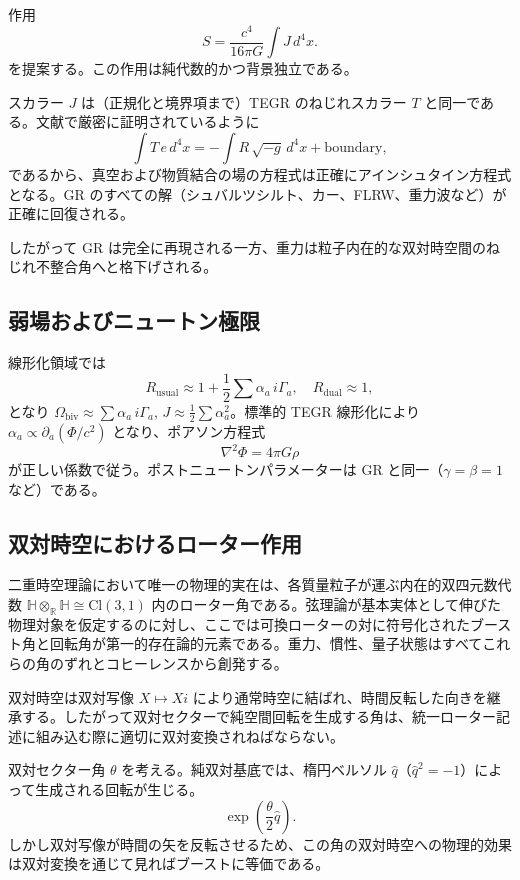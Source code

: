 \documentclass[dvipdfmx,a4paper]{article}
\begin{document}
作用
\[
S = \frac{c^4}{16\pi G} \int J \, d^4x.
\]
を提案する。この作用は純代数的かつ背景独立である。

スカラー $J$ は（正規化と境界項まで）TEGR のねじれスカラー $T$ と同一である。文献で厳密に証明されているように
\[
\int T \, e \, d^4x = -\int R \, \sqrt{-g} \, d^4x + \mathrm{boundary},
\]
であるから、真空および物質結合の場の方程式は正確にアインシュタイン方程式となる。GR のすべての解（シュバルツシルト、カー、FLRW、重力波など）が正確に回復される。

したがって GR は完全に再現される一方、重力は粒子内在的な双対時空間のねじれ不整合角へと格下げされる。

\subsection{弱場およびニュートン極限}

線形化領域では
\[
R_\text{usual} \approx 1 + \frac{1}{2} \sum \alpha_a \, i\Gamma_a, \quad R_\text{dual} \approx 1,
\]
となり $\Omega_\text{biv} \approx \sum \alpha_a \, i\Gamma_a$, $J \approx \frac{1}{2} \sum \alpha_a^2$。標準的 TEGR 線形化により $\alpha_a \propto \partial_a (\Phi/c^2)$ となり、ポアソン方程式
\[
\nabla^2 \Phi = 4\pi G \rho
\]
が正しい係数で従う。ポストニュートンパラメーターは GR と同一（$\gamma = \beta = 1$ など）である。

\subsection{双対時空におけるローター作用}
\label{subsec:dual-rotors}

二重時空理論において唯一の物理的実在は、各質量粒子が運ぶ内在的双四元数代数 $\mathbb{H} \otimes_{\mathbb{R}} \mathbb{H} \cong \mathrm{Cl}(3,1)$ 内のローター角である。弦理論が基本実体として伸びた物理対象を仮定するのに対し、ここでは可換ローターの対に符号化されたブースト角と回転角が第一的存在論的元素である。重力、慣性、量子状態はすべてこれらの角のずれとコヒーレンスから創発する。

双対時空は双対写像 $X \mapsto Xi$ により通常時空に結ばれ、時間反転した向きを継承する。したがって双対セクターで純空間回転を生成する角は、統一ローター記述に組み込む際に適切に双対変換されねばならない。

双対セクター角 $\theta$ を考える。純双対基底では、楕円ベルソル $\hat{q}$（$\hat{q}^2 = -1$）によって生成される回転が生じる。
\[
\exp\left( \frac{\theta}{2} \hat{q} \right).
\]
しかし双対写像が時間の矢を反転させるため、この角の双対時空への物理的効果は双対変換を通じて見ればブーストに等価である。
\end{document}
